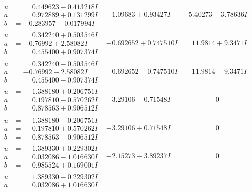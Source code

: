 \documentclass[1p]{elsarticle_modified}
\theoremstyle{definition}
\begin{document}
$$\begin{array}{c|c|c}
 \hline 
\begin{aligned}
u &= \phantom{-}0.449623 - 0.413218 I \\
a &= \phantom{-}0.972889 + 0.131299 I \\
b &= -0.283957 - 0.017994 I\end{aligned}
 & -1.09683 + 0.93427 I & -5.40273 - 3.78636 I \\ \hline\begin{aligned}
u &= \phantom{-}0.342240 + 0.503546 I \\
a &= -0.76992 + 2.58082 I \\
b &= \phantom{-}0.455400 + 0.907374 I\end{aligned}
 & -0.692652 + 0.747510 I & \phantom{-}11.9814 + 9.3471 I \\ \hline\begin{aligned}
u &= \phantom{-}0.342240 - 0.503546 I \\
a &= -0.76992 - 2.58082 I \\
b &= \phantom{-}0.455400 - 0.907374 I\end{aligned}
 & -0.692652 - 0.747510 I & \phantom{-}11.9814 - 9.3471 I \\ \hline\begin{aligned}
u &= \phantom{-}1.388180 + 0.206751 I \\
a &= \phantom{-}0.197810 - 0.570262 I \\
b &= \phantom{-}0.878563 + 0.906512 I\end{aligned}
 & -3.29106 - 0.71548 I & \phantom{-0.000000 } 0 \\ \hline\begin{aligned}
u &= \phantom{-}1.388180 - 0.206751 I \\
a &= \phantom{-}0.197810 + 0.570262 I \\
b &= \phantom{-}0.878563 - 0.906512 I\end{aligned}
 & -3.29106 + 0.71548 I & \phantom{-0.000000 } 0 \\ \hline\begin{aligned}
u &= \phantom{-}1.389330 + 0.229302 I \\
a &= \phantom{-}0.032086 - 1.016630 I \\
b &= \phantom{-}0.985524 + 0.169001 I\end{aligned}
 & -2.15273 - 3.89237 I & \phantom{-0.000000 } 0 \\ \hline\begin{aligned}
u &= \phantom{-}1.389330 - 0.229302 I \\
a &= \phantom{-}0.032086 + 1.016630 I \\

\end{aligned}
\end{array}$$
\end{document}
